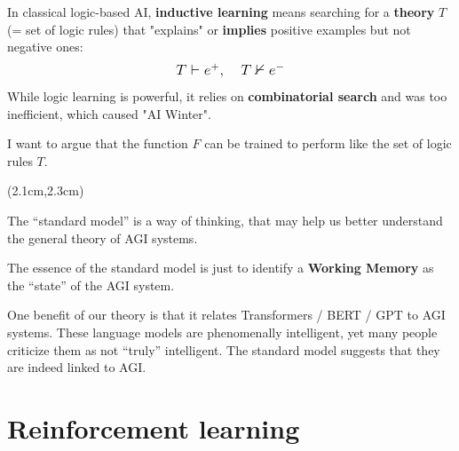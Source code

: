 \begin{preview}
\begin{minipage}{\textwidth}
In classical logic-based AI, \textbf{inductive learning} means searching for a \textbf{theory} $T$ (= set of logic rules) that "explains" or \textbf{implies} positive examples but not negative ones:
\begin{equation}
\mbox{\large\(
T \vdash e^{+}, \quad T \nvdash e^{-}
\)}
\end{equation}
While logic learning is powerful, it relies on \textbf{combinatorial search} and was too inefficient, which caused "AI Winter".

I want to argue that the function $F$ can be trained to perform like the set of logic rules $T$.  
\end{minipage}
\end{preview}

\begin{preview}
\setlength{\parskip}{0.4\baselineskip}
\begin{textblock*}{20cm}(2.1cm,2.3cm) %
	{}
	\hspace{7cm}
	\bfseries\color{blue}{\small 逻辑化 AGI 基础}
\end{textblock*}

\vspace*{0.7cm} The ``standard model'' is a way of thinking, that may help us better understand the general theory of AGI systems.

The essence of the standard model is just to identify a \textbf{Working Memory} as the ``state'' of the AGI system.

One benefit of our theory is that it relates Transformers / BERT / GPT to AGI systems.  These language models are phenomenally intelligent, yet many people criticize them as not ``truly'' intelligent.  The standard model suggests that they are indeed linked to AGI.

\section{Reinforcement learning}


\end{preview}
